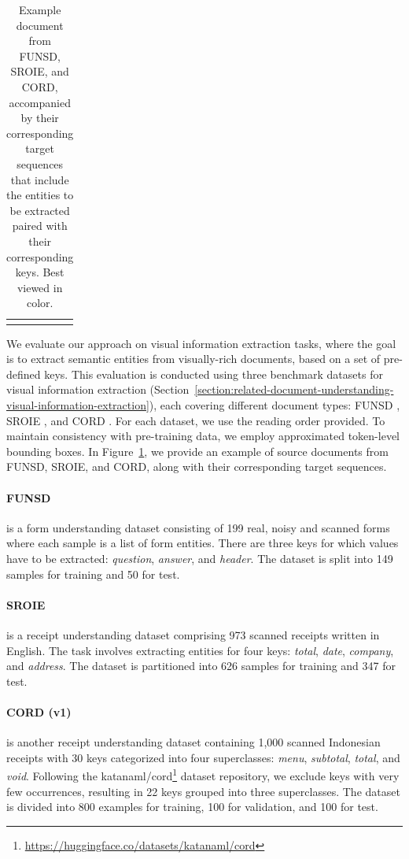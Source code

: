 \begin{table}[ht]
\begin{tabular}{  c | c | c  }
\begin{minipage}{.2\textwidth}
    \end{minipage}
    \\
  \end{tabular}
  \caption{Example document from FUNSD, SROIE, and CORD, accompanied by their corresponding target sequences that include the entities to be extracted paired with their corresponding keys. Best viewed in color.}
  \label{fig:source-target-sample}
\end{table}

We evaluate our approach on visual information extraction tasks, where the goal is to extract semantic entities from visually-rich documents, based on a set of pre-defined keys. This evaluation is conducted using three benchmark datasets for visual information extraction (Section~\ref{section:related-document-understanding-visual-information-extraction}), each covering different document types: FUNSD \citep{jaume2019funsd}, SROIE \citep{huang2019icdar2019}, and CORD \citep{park2019cord}. For each dataset, we use the reading order provided. To maintain consistency with pre-training data, we employ approximated token-level bounding boxes. In Figure~\ref{fig:source-target-sample}, we provide an example of source documents from FUNSD, SROIE, and CORD, along with their corresponding target sequences. 

\paragraph{FUNSD} \citep{jaume2019funsd} is a form understanding dataset consisting of 199 real, noisy and scanned forms where each sample is a list of form entities. There are three keys for which values have to be extracted: \textit{question}, \textit{answer}, and \textit{header}. The dataset is split into 149 samples for training and 50 for test.

\paragraph{SROIE} \citep{huang2019icdar2019} is a receipt understanding dataset comprising 973 scanned receipts written in English. The task involves extracting entities for four keys: \textit{total}, \textit{date}, \textit{company}, and \textit{address}. The dataset is partitioned into 626 samples for training and 347 for test. 

\paragraph{CORD (v1)} \citep{park2019cord} is another receipt understanding dataset containing 1,000 scanned Indonesian receipts with 30 keys categorized into four superclasses: \textit{menu}, \textit{subtotal}, \textit{total}, and \textit{void}. Following the katanaml/cord\footnote{\url{https://huggingface.co/datasets/katanaml/cord}} dataset repository, we exclude keys with very few occurrences, resulting in 22 keys grouped into three superclasses. The dataset is divided into 800 examples for training, 100 for validation, and 100 for test. 

